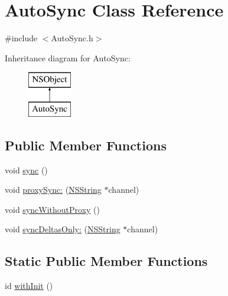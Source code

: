 \hypertarget{interface_auto_sync}{
\section{\-Auto\-Sync \-Class \-Reference}
\label{interface_auto_sync}
}


{\ttfamily \#include $<$\-Auto\-Sync.\-h$>$}

\-Inheritance diagram for \-Auto\-Sync\-:\begin{figure}[H]
\begin{center}
\leavevmode
\includegraphics[height=2.000000cm]{interface_auto_sync}
\end{center}
\end{figure}
\subsection*{\-Public \-Member \-Functions}
\begin{DoxyCompactItemize}
\item 
void \hyperlink{interface_auto_sync_a6cfa02702aee2cbab3bd3aac5bd4e85a}{sync} ()
\item 
void \hyperlink{interface_auto_sync_a2705463f927f7f963182ac5cf69cd0ba}{proxy\-Sync\-:} (\hyperlink{class_n_s_string}{\-N\-S\-String} $\ast$channel)
\item 
void \hyperlink{interface_auto_sync_af709112bb5c82d4ea38690dba6e394e5}{sync\-Without\-Proxy} ()
\item 
void \hyperlink{interface_auto_sync_a81b8fddb7f12030db2848b410b9e9f41}{sync\-Deltas\-Only\-:} (\hyperlink{class_n_s_string}{\-N\-S\-String} $\ast$channel)
\end{DoxyCompactItemize}
\subsection*{\-Static \-Public \-Member \-Functions}
\begin{DoxyCompactItemize}
\item 
id \hyperlink{interface_auto_sync_ae9d2e39a2d0b59ac270dd9aa38c7f3bc}{with\-Init} ()
\end{DoxyCompactItemize}


